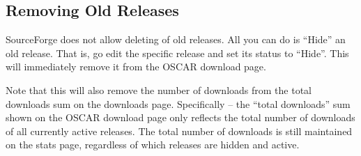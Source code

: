 \subsection{Removing Old Releases}

SourceForge does not allow deleting of old releases.  All you can do
is ``Hide'' an old release.  That is, go edit the specific release and
set its status to ``Hide''.  This will immediately remove it from the
OSCAR download page.

Note that this will also remove the number of downloads from the total
downloads sum on the downloads page.  Specifically -- the ``total
downloads'' sum shown on the OSCAR download page only reflects the
total number of downloads of all currently active releases.  The total
number of downloads is still maintained on the stats page, regardless
of which releases are hidden and active.

